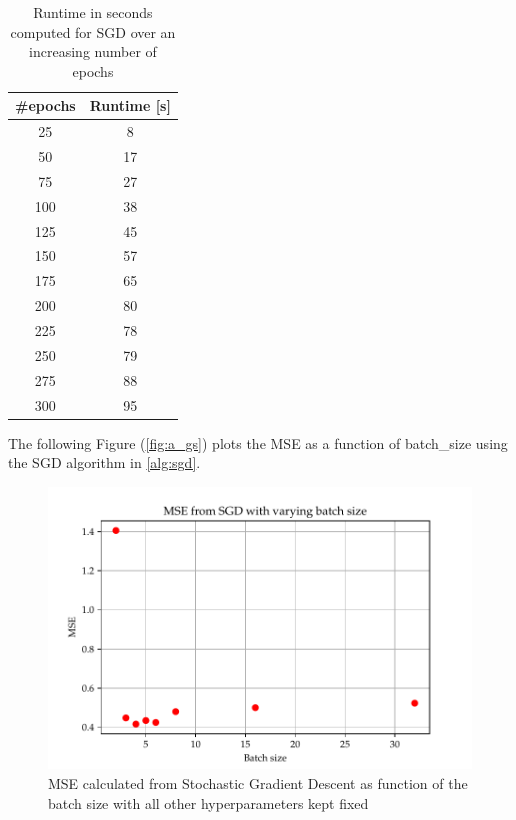 \documentclass
[twocolumn,
secnumarabic,
nobibnotes,
aps,
prl,
reprint,
groupedaddress,
amsmath,
amssymb
]{revtex4-2}
\begin{document}
\begin{table}
  \caption{\label{tab:a_epoch_run}Runtime in seconds computed for SGD over an increasing number of epochs}
  \begin{tabular}{|c|c|}
    \hline
    \#epochs & Runtime [s] \\ \hline
    25       & 8           \\
    50       & 17          \\
    75       & 27          \\
    100      & 38          \\
    125      & 45          \\
    150      & 57          \\
    175      & 65          \\
    200      & 80          \\
    225      & 78          \\
    250      & 79          \\
    275      & 88          \\
    300      & 95          \\
    \hline
  \end{tabular}
\end{table}

The following Figure (\ref{fig:a_gs}) plots the MSE as a function of batch\_size using the SGD algorithm in \ref{alg:sgd}.

\begin{figure}
  \includegraphics[width=\columnwidth]{figures/EX_A_mse_with_varying_batch_size.pdf}
  \caption{\label{fig:a_bs}MSE calculated from Stochastic Gradient Descent as function of the batch size with all other hyperparameters kept fixed}
\end{figure}
\end{document}
